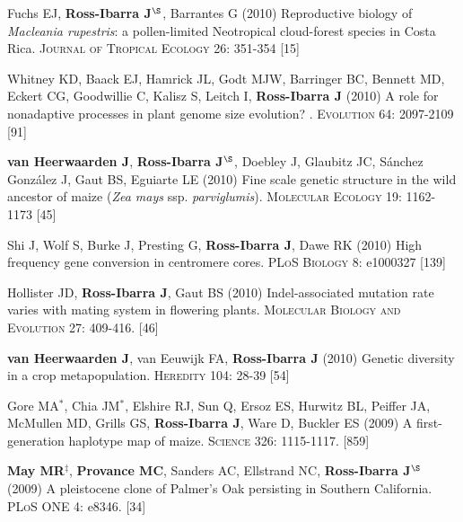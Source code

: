 \documentclass[letterpaper,10pt]{article}
\begin{document}
\begin{etaremune}
\item Fuchs EJ, {\bf Ross-Ibarra J}$^\S$, Barrantes G (2010) Reproductive biology of \emph{Macleania rupestris}: a pollen-limited Neotropical cloud-forest species in Costa Rica.  \textsc{Journal of Tropical Ecology} 26: 351-354
 [15]\\


\item Whitney KD, Baack EJ, Hamrick JL, Godt MJW, Barringer BC, Bennett MD, Eckert CG, Goodwillie C, Kalisz S, Leitch I, {\bf Ross-Ibarra J} (2010) A role for nonadaptive processes in plant genome size evolution? . \textsc{Evolution} 64: 2097-2109
 [91]\\


\item {\bf van Heerwaarden J}, {\bf Ross-Ibarra J}$^\S$, Doebley J, Glaubitz JC, S\'{a}nchez Gonz\'{a}lez J, Gaut BS, Eguiarte LE (2010) Fine scale genetic structure in the wild ancestor of maize (\emph{Zea mays} ssp. \emph{parviglumis}).  \textsc{Molecular Ecology} 19: 1162-1173
 [45]\\


\item Shi J, Wolf S, Burke J, Presting G, {\bf Ross-Ibarra J}, Dawe RK (2010) High frequency gene conversion in centromere cores.  \textsc{PLoS Biology} 8: e1000327
 [139]\\


\item Hollister JD, {\bf Ross-Ibarra J}, Gaut BS (2010) Indel-associated mutation rate varies with mating system in flowering plants.  \textsc{Molecular Biology and Evolution} 27: 409-416.
 [46]\\

\item {\bf van Heerwaarden J}, van Eeuwijk FA, {\bf Ross-Ibarra J} (2010) Genetic diversity in a crop metapopulation.  \textsc{Heredity} 104: 28-39
 [54]\\


\item Gore MA$^*$, Chia JM$^*$, Elshire RJ, Sun Q, Ersoz ES, Hurwitz BL, Peiffer JA, McMullen MD, Grills GS, {\bf Ross-Ibarra J}, Ware D, Buckler ES (2009) A first-generation haplotype map of maize.  \textsc{Science 326}: 1115-1117.
 [859]\\


\item {\bf May MR}$^\ddagger$, {\bf Provance MC}, Sanders AC, Ellstrand NC, {\bf Ross-Ibarra J}$^\S$ (2009) A pleistocene clone of Palmer's Oak persisting in Southern California.  \textsc{PLoS ONE} 4: e8346.
 [34]\\



\end{etaremune}
\end{document}
